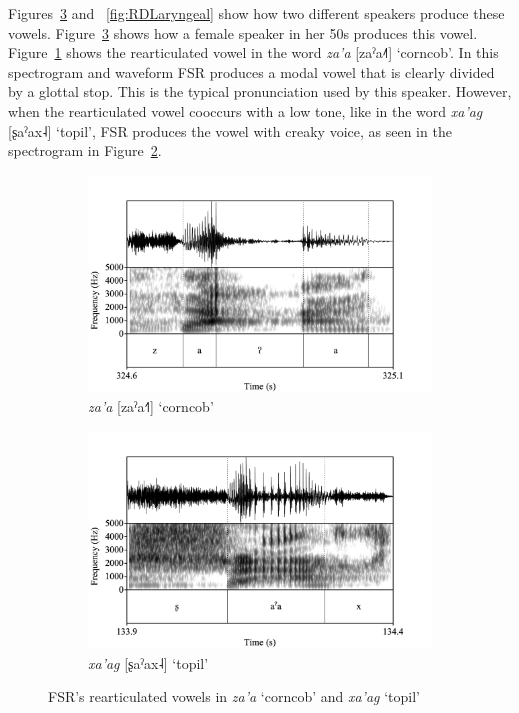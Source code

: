 Figures~\ref{fig:FSRLaryngeal} and ~\ref{fig:RDLaryngeal} show how two different speakers produce these vowels. Figure~\ref{fig:FSRLaryngeal} shows how a female speaker in her 50s produces this vowel. Figure~\ref{fig:FSRza'a} shows the rearticulated vowel in the word \textit{za'a} [zaˀa˨˥] `corncob'. In this spectrogram and waveform FSR produces a modal vowel that is clearly divided by a glottal stop. This is the typical pronunciation used by this speaker. However, when the rearticulated vowel cooccurs with a low tone, like in the word \textit{xa'ag} [ʂaˀax˨] `topil', FSR produces the vowel with creaky voice, as seen in the spectrogram in Figure~\ref{fig:FSRxa'ag}.

\begin{figure}[h!]
	\centering
	\begin{subfigure}{.5\textwidth}
		\centering
		\includegraphics[width=\linewidth]{images/Spectrograms/za'a.png}
		\caption{\textit{za'a} [zaˀa˧˥] `corncob'}
		\label{fig:FSRza'a}
	\end{subfigure}%
	\begin{subfigure}{.5\textwidth}
		\centering
		\includegraphics[width=\linewidth]{images/Spectrograms/xa'ag.png}
		\caption{\textit{xa'ag} [ʂaˀax˨] `topil'}
		\label{fig:FSRxa'ag}
	\end{subfigure}	
	\caption{FSR's rearticulated vowels in \textit{za'a} `corncob' and \textit{xa'ag} `topil'}
	\label{fig:FSRLaryngeal}
\end{figure}

